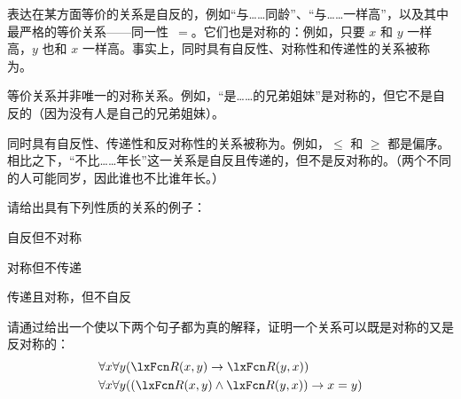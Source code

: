 表达在某方面等价的关系是自反的，例如“与……同龄”、“与……一样高”，以及其中最严格的等价关系——同一性~$=$。它们也是对称的：例如，只要 $x$ 和 $y$ 一样高，$y$ 也和 $x$ 一样高。事实上，同时具有自反性、对称性和传递性的关系被称为。

等价关系并非唯一的对称关系。例如，“是……的兄弟姐妹”是对称的，但它不是自反的（因为没有人是自己的兄弟姐妹）。

同时具有自反性、传递性和反对称性的关系被称为。例如，$\le$ 和 $\ge$ 都是偏序。相比之下，“不比……年长”这一关系是自反且传递的，但不是反对称的。（两个不同的人可能同岁，因此谁也不比谁年长。）

\practiceproblems

\problempart
请给出具有下列性质的关系的例子：


\begin{compactlist}
	\item 自反但不对称
	\item 对称但不传递
	\item 传递且对称，但不自反
\end{compactlist}

\problempart
请通过给出一个使以下两个句子都为真的解释，证明一个关系可以既是对称的又是反对称的：
\begin{align*}
	& \forall x\forall y(\atom{R}{x,y} \eif \atom{R}{y,x})\\
	& \forall x\forall y((\atom{R}{x,y} \eand \atom{R}{y,x}) \eif x=y)
\end{align*}

